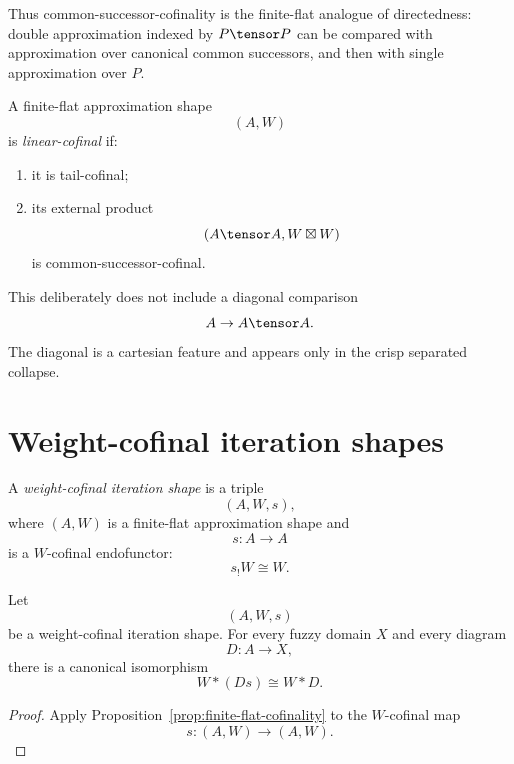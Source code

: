 Thus common-successor-cofinality is the finite-flat analogue of directedness:
double approximation indexed by \(P\tensor P\) can be compared with
approximation over canonical common successors, and then with single
approximation over \(P\).

\begin{definition}
\label{def:linear-cofinal-ff-approximation-shape}
A finite-flat approximation shape
\[
    (A,W)
\]
is \emph{linear-cofinal} if:

\begin{enumerate}
    \item it is tail-cofinal;

    \item its external product
    \[
        (A\tensor A,W\boxtimes W)
    \]
    is common-successor-cofinal.
\end{enumerate}
\end{definition}

This deliberately does not include a diagonal comparison
\[
    A\to A\tensor A.
\]
The diagonal is a cartesian feature and appears only in the crisp separated
collapse.

\section{Weight-cofinal iteration shapes}
\label{sec:weight-cofinal-iteration-shapes}

\begin{definition}
\label{def:weight-cofinal-iteration-shape}
A \emph{weight-cofinal iteration shape} is a triple
\[
    (A,W,s),
\]
where \((A,W)\) is a finite-flat approximation shape and
\[
    s:A\to A
\]
is a \(W\)-cofinal endofunctor:
\[
    s_!W\cong W.
\]
\end{definition}

\begin{lemma}
\label{lem:shift-invariance-rde}
Let
\[
    (A,W,s)
\]
be a weight-cofinal iteration shape.  For every fuzzy domain \(X\) and every
diagram
\[
    D:A\to X,
\]
there is a canonical isomorphism
\[
    W*(Ds)
    \cong
    W*D.
\]
\end{lemma}

\begin{proof}
Apply Proposition~\ref{prop:finite-flat-cofinality} to the \(W\)-cofinal map
\[
    s:(A,W)\to(A,W).
\]
\end{proof}

